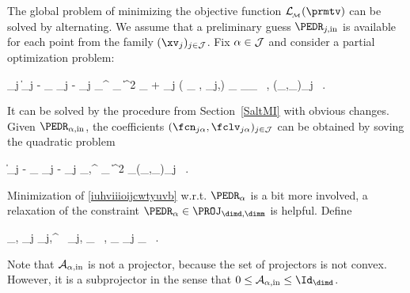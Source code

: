 \label{SmaniEDR}
The global problem of minimizing the objective function \( \LL_{\subM}(\prmtv) \)
can be solved by alternating.
We assume that  
a preliminary guess \( \PEDR_{j,\init} \) is available for each point from the family \( (\xv_{j})_{j \in \JJJ} \).
Fix \( \alpha \in \mathcal{J} \) and consider a partial optimization problem:
\begin{EQA}[c]
	\sum_{j \in \JJJ}
	\bigl\| \Imav_{j} - \fcn_{\jjl} \Sv_{j} - \UV_{j} \PEDR_{\jl}^{\T} \fclv_{\jjl} \bigr\|^{2} \weightM_{\jjl}
	+ \lambda \sum_{j \in \JJJ} \epsilon( \PEDR_{\jl} , \PEDR_{j,\init}) \; \weightM_{\jjl}
	\to \inf_{\PEDR_{\jl} \, , (\fcn_{\jjl},\fclv_{\jjl})_{j \in \JJJ}}
	\, .
	\qquad
\label{iuhviiioijcwtyuvb}
\end{EQA}
It can be solved by the procedure from Section~\ref{SaltMI}
with obvious changes.
Given \( \PEDR_{\jl,\init} \), the coefficients \( (\fcn_{\jjl},\fclv_{\jjl})_{j \in \JJJ} \) can be obtained by soving 
the quadratic problem
\begin{EQA}[c]
	\bigl\| \Imav_{j} - \fcn_{\jjl} \Sv_{j} - \UV_{j} \PEDR_{\jl,\init}^{\T} \fclv_{\jjl} \bigr\|^{2}
	\to \inf_{(\fcn_{\jjl},\fclv_{\jjl})_{j \in \JJJ}}
	\, .
	\qquad
\label{kiiilfduy543rbggioe46}
\end{EQA}
Minimization of {\color{blue} \eqref{iuhviiioijcwtyuvb}} w.r.t. \( \PEDR_{\jl} \) is a bit more involved,
a relaxation of the constraint \( \PEDR_{\jl} \in \PROJ_{\dimd,\dimm} \) is helpful.
Define
\begin{EQA}[c]
	\IEDR_{\jl,\init}
	\eqdef
	 \sum_{j \in \JJJ} \PEDR_{j,\init}^{\T} \, \PEDR_{j,\init} \; \weightM_{\jjl}
	\, ,
	\qquad
	\WeightM_{\jl}
	\eqdef
	\sum_{j \in \JJJ} \weightM_{\jjl}	
	\, .
\label{jfu88uuujecvyyyyyue}
\end{EQA}
Note that \( \mathcal{A}_{\alpha,\operatorname{in}} \) is not a projector, because the set of projectors is not convex.
However, it is a subprojector in the sense that \( 0 \leq \IEDR_{\jl,\init} \leq \Id_{\dimd} \).



